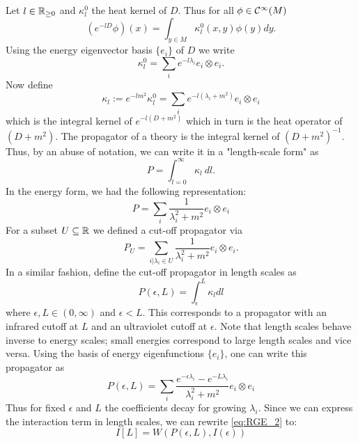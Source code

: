 Let $l \in \mathbb{R}_{\geq 0}$ and $\kappa^0_l$ the heat kernel of $D$. Thus for all $\phi \in \Ci(M)$
\begin{equation}
  \left( e^{-l D}\phi \right) (x) = \int_{y \in M} \kappa^0_l (x,y) \phi(y) dy.
\end{equation}
Using the energy eigenvector basis $\{e_i\}$ of $D$ we write
\begin{equation}
  \kappa^0_l = \sum_i e^{-l \lambda_i} e_i \otimes e_i.
\end{equation}
Now define
\begin{equation}
  \kappa_l := e^{-l m^2} \kappa^0_l = \sum_i e^{-l (\lambda_i + m^2)} e_i \otimes e_i
\end{equation}
which is the integral kernel of $e^{-l (D+m^2)}$ which in turn is the heat operator of $(D+m^2)$. The propagator of a theory is the integral kernel of $(D+m^2)^{-1}$. Thus, by an abuse of notation, we can write it in a "length-scale form" as
\begin{equation}
  P = \int_{l=0}^\infty \kappa_l \ dl.
\end{equation}
In the energy form, we had the following representation:
\begin{equation}
  P = \sum_i \frac{1}{\lambda_i^2 + m^2} e_i \otimes e_i
\end{equation}
For a subset $U \subseteq \mathbb{R}$ we defined a cut-off propagator via
\begin{equation}
  P_U = \sum_{i|\lambda_i \in U} \frac{1}{\lambda_i^2 + m^2} e_i \otimes e_i.
\end{equation}
In a similar fashion, define the cut-off propagator in length scales as
\begin{equation}
  P(\epsilon, L) = \int_\epsilon^L \kappa_l dl
\end{equation}
where $\epsilon, L \in (0,\infty)$ and $\epsilon < L$. This corresponds to a propagator with an infrared cutoff at $L$ and an ultraviolet cutoff at $\epsilon$. Note that length scales behave inverse to energy scales; small energies correspond to large length scales and vice versa. Using the basis of energy eigenfunctions $\{e_i\}$, one can write this propagator as
\begin{equation}
  P(\epsilon, L) = \sum_i \frac{e^{-\epsilon \lambda_i} - e^{-L  \lambda_i}}{\lambda_i^2 + m^2} e_i \otimes e_i
\end{equation}
Thus for fixed $\epsilon$ and $L$ the coefficients decay for growing $\lambda_i$. Since we can express the interaction term in length scales, we can rewrite \eqref{eq:RGE_2} to:
\begin{equation}
\label{eq:RGE_length}\tag{L-RGE}
  I[L] = W(P(\epsilon, L), I(\epsilon))
\end{equation}

